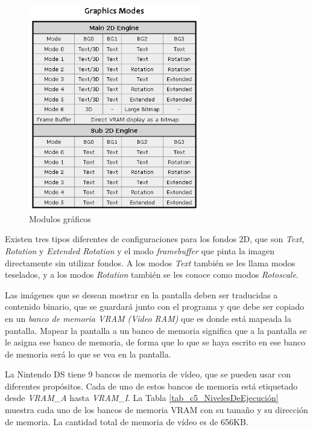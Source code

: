 \begin{figure}[t]
	\centering
	\includegraphics[height=9cm]{Figuras/C5/c5_modos-graficos.png}
	\caption{Modulos gráficos}
	\label{fig_c5_modulos}
\end{figure}

Existen tres tipos diferentes de configuraciones para los fondos 2D, que son \textit{Text}, \textit{Rotation} y \textit{Extended Rotation} y el modo \textit{framebuffer} que pinta la imagen directamente sin utilizar fondos. A los modos \textit{Text} también se les llama modos teselados, y a los modos \textit{Rotation} también se les conoce como modos \textit{Rotoscale}.

Las imágenes que se desean mostrar en la pantalla deben ser traducidas a contenido binario, que se guardará junto con el programa y que debe ser copiado en un \textit{banco de memoria VRAM (Video RAM)} que es donde está mapeada la pantalla. Mapear la pantalla a un banco de memoria significa que a la pantalla se le asigna ese banco de memoria, de forma que lo que se haya escrito en ese banco de memoria será lo que se vea en la pantalla. 

La Nintendo DS tiene 9 bancos de memoria de vídeo, que se pueden usar con diferentes propósitos. Cada de uno de estos bancos de memoria está etiquetado desde \textit{VRAM\_A} hasta \textit{VRAM\_I}. La Tabla \ref{tab_c5_NivelesDeEjecución} muestra cada uno de los bancos de memoria VRAM con su tamaño y su dirección de memoria. La cantidad total de memoria de vídeo es de 656KB. 

